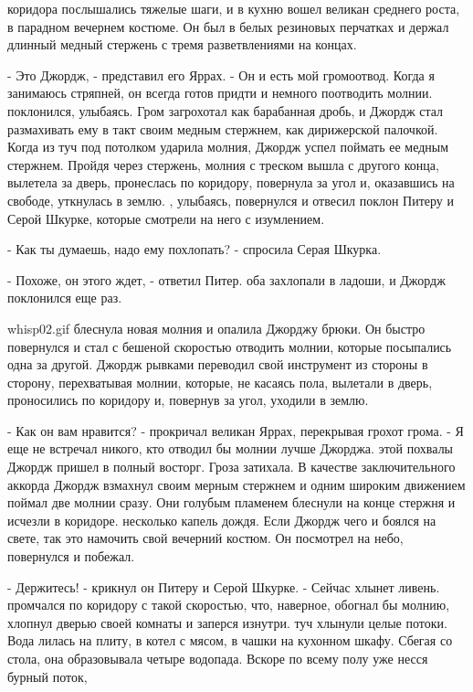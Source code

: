  коридора послышались тяжелые шаги, и в кухню вошел великан 
среднего роста, в парадном вечернем костюме. Он был в белых резиновых 
перчатках и держал длинный медный стержень с тремя разветвлениями на 
концах.
\par- Это Джордж, - представил его Яррах. - Он и есть мой громоотвод. 
Когда я занимаюсь стряпней, он всегда готов придти и немного 
поотводить молнии.
 поклонился, улыбаясь. Гром загрохотал как барабанная дробь, 
и Джордж стал размахивать ему в такт своим медным стержнем, как 
дирижерской палочкой. Когда из туч под потолком ударила молния, Джордж 
успел поймать ее медным стержнем. Пройдя через стержень, молния с 
треском вышла с другого конца, вылетела за дверь, пронеслась по 
коридору, повернула за угол и, оказавшись на свободе, уткнулась в 
землю.
, улыбаясь, повернулся и отвесил поклон Питеру и Серой 
Шкурке, которые смотрели на него с изумлением.
\par- Как ты думаешь, надо ему похлопать? - спросила Серая Шкурка.
\par- Похоже, он этого ждет, - ответил Питер.
 оба захлопали в ладоши, и Джордж поклонился еще раз.
\par{whisp02.gif}
 блеснула новая молния и опалила Джорджу брюки. Он быстро 
повернулся и стал с бешеной скоростью отводить молнии, которые 
посыпались одна за другой. Джордж рывками переводил свой инструмент из 
стороны в сторону, перехватывая молнии, которые, не касаясь пола, 
вылетали в дверь, проносились по коридору и, повернув за угол, уходили 
в землю.
\par- Как он вам нравится? - прокричал великан Яррах, перекрывая 
грохот грома. - Я еще не встречал никого, кто отводил бы молнии лучше 
Джорджа.
 этой похвалы Джордж пришел в полный восторг. Гроза затихала. В 
качестве заключительного аккорда Джордж взмахнул своим мерным стержнем 
и одним широким движением поймал две молнии сразу. Они голубым 
пламенем блеснули на конце стержня и исчезли в коридоре.
 несколько капель дождя. Если Джордж чего и боялся на свете, 
так это намочить свой вечерний костюм. Он посмотрел на небо, 
повернулся и побежал.
\par- Держитесь! - крикнул он Питеру и Серой Шкурке. - Сейчас хлынет 
ливень.
 промчался по коридору с такой скоростью, что, наверное, обогнал 
бы молнию, хлопнул дверью своей комнаты и заперся изнутри.
 туч хлынули целые потоки. Вода лилась на плиту, в котел с 
мясом, в чашки на кухонном шкафу. Сбегая со стола, она образовывала 
четыре водопада. Вскоре по всему полу уже несся бурный поток, 
